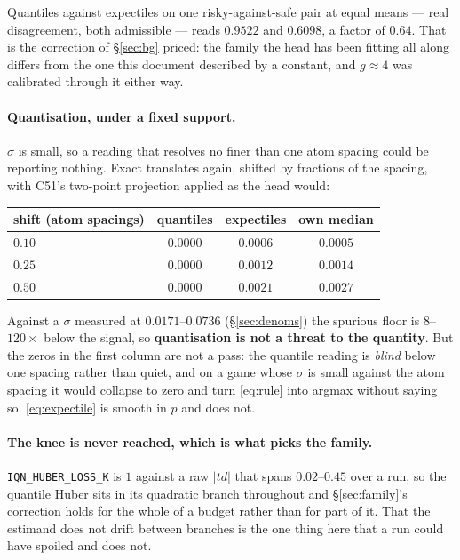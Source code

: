 \documentclass{article}
\newcommand{\srank}{\sigma}
\begin{document}
Quantiles against expectiles on one risky-against-safe pair at equal means --- real disagreement,
both admissible --- reads $0.9522$ and $0.6098$, a factor of $0.64$. That is the correction of
\S\ref{sec:bg} priced: the family the head has been fitting all along differs from the one this
document described by a constant, and $g \approx 4$ was calibrated through it either way.

\paragraph{Quantisation, under a fixed support.} $\srank$ is small, so a reading that resolves no
finer than one atom spacing could be reporting nothing. Exact translates again, shifted by
fractions of the spacing, with C51's two-point projection applied as the head would:

\begin{center}
\small
\begin{tabular}{lccc}
  \toprule
  shift (atom spacings) & quantiles & expectiles & own median \\
  \midrule
  $0.10$ & $0.0000$ & $0.0006$ & $0.0005$ \\
  $0.25$ & $0.0000$ & $0.0012$ & $0.0014$ \\
  $0.50$ & $0.0000$ & $0.0021$ & $0.0027$ \\
  \bottomrule
\end{tabular}
\end{center}

Against a $\srank$ measured at $0.0171$--$0.0736$ (\S\ref{sec:denoms}) the spurious floor is
$8$--$120\times$ below the signal, so \textbf{quantisation is not a threat to the quantity}. But
the zeros in the first column are not a pass: the quantile reading is \emph{blind} below one
spacing rather than quiet, and on a game whose $\srank$ is small against the atom spacing it
would collapse to zero and turn \eqref{eq:rule} into argmax without saying so.
\eqref{eq:expectile} is smooth in $p$ and does not.

\paragraph{The knee is never reached, which is what picks the family.}
\texttt{IQN\_HUBER\_LOSS\_K} is $1$ against a raw $|td|$ that spans $0.02$--$0.45$ over a run, so
the quantile Huber sits in its quadratic branch throughout and \S\ref{sec:family}'s correction
holds for the whole of a budget rather than for part of it. That the estimand does not drift
between branches is the one thing here that a run could have spoiled and does not.
\end{document}
